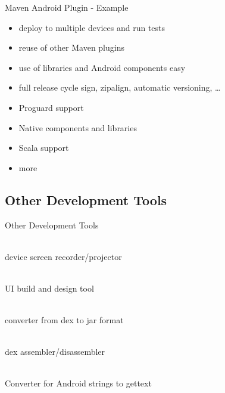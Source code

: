 \documentclass[aspectratio=169]{beamer}
\newcommand{\surl}[1] {{\tiny \url{#1}}}
\begin{document}
    \begin{frame}{Maven Android Plugin - Example}
      \begin{itemize}
        \item<1-> deploy to multiple devices and run tests
        \item<2-> reuse of other Maven plugins
        \item<3-> use of libraries and Android components easy
        \item<4-> full release cycle sign, zipalign, automatic versioning, \dots
        \item<5-> Proguard support
        \item<6-> Native components and libraries
        \item<7-> Scala support
        \item<8-> more
      \end{itemize}
    \end{frame}

  \subsection{Other Development Tools}

    \begin{frame}{Other Development Tools}
      \begin{description}
        \item<1->[Droid at Screen \surl{http://blog.ribomation.com/2010/01/droidscreen/}] \hfill \\ device screen recorder/projector 

        \item<2->[DroidDraw \surl{http://www.droiddraw.org/}] \hfill \\  UI build and design tool 
 
        \item<3->[dex2jar \surl{http://code.google.com/p/dex2jar/}] \hfill \\ converter from dex to jar format 

        \item<4->[smali/baksmali \surl{http://code.google.com/p/smali/}] \hfill \\ dex assembler/disassembler 

        \item<5->[Android2PO \surl{https://github.com/miracle2k/android2po}] \hfill \\ Converter for Android strings to gettext 
      \end{description}
   \end{frame}
\end{document}
